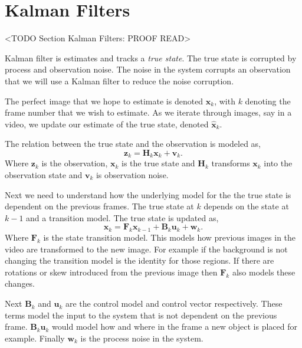 \section{Kalman Filters}
	<TODO Section Kalman Filters: PROOF READ>

Kalman filter is estimates and tracks a \emph{true state}. The true state is corrupted by process and observation noise. The noise in the system corrupts an observation that we will use a Kalman filter to reduce the noise corruption. 

The perfect image that we hope to estimate is denoted $\mathbf{x}_k$, with $k$ denoting the frame number that we wish to estimate. As we iterate through images, say in a video, we update our estimate of the true state, denoted $\hat{\mathbf{x}}_k$.

The relation between the true state and the observation is modeled as,
\begin{equation}
\mathbf{z}_k = \mathbf{H}_k\mathbf{x}_{k} + \mathbf{v}_k.
\end{equation}
\noindent 
Where $\mathbf{z}_k$ is the observation, $\mathbf{x}_k$ is the true state and $\mathbf{H}_k$ transforms $\mathbf{x}_k$ into the observation state and $\mathbf{v}_k$ is observation noise. 

Next we need to understand how the underlying model for the the true state is dependent on the previous frames. The true state at $k$ depends on the state at $k-1$ and a transition model. The true state is updated as,	
\begin{equation}
\mathbf{x}_k = \mathbf{F}_k\mathbf{x}_{k-1} + \mathbf{B}_k\mathbf{u}_{k} + \mathbf{w}_k.
\end{equation}
\noindent
Where $\mathbf{F}_k$ is the state transition model. This models how previous images in the video are transformed to the new image. For example if the background is not changing the transition model is the identity for those regions. If there are rotations or skew introduced from the previous image then $\mathbf{F}_k$ also models these changes.


Next $\mathbf{B}_k$ and $\mathbf{u}_{k}$ are the control model and control vector respectively. These terms model the input to the system that is not dependent on the previous frame. $\mathbf{B}_k\mathbf{u}_{k}$ would model how and where in the frame a new object is placed for example. Finally $\mathbf{w}_k$ is the process noise in the system.

